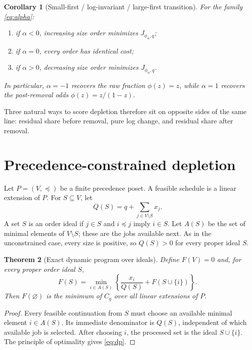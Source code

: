 \documentclass[pdflatex,iicol,sn-basic]{sn-jnl}
\theoremstyle{thmstyleone}
\newtheorem{theorem}{Theorem}[section]
\newtheorem{corollary}[theorem]{Corollary}
\theoremstyle{thmstyletwo}
\theoremstyle{thmstylethree}
\begin{document}
\begin{corollary}[Small-first / log-invariant / large-first transition]
\label{cor:phase}
For the family \eqref{eq:alpha}:
\begin{enumerate}[label=(\roman*),leftmargin=2em]
\item if \(\alpha<0\), increasing size order minimizes \(J_{\phi_\alpha,q}\);
\item if \(\alpha=0\), every order has identical cost;
\item if \(\alpha>0\), decreasing size order minimizes \(J_{\phi_\alpha,q}\).
\end{enumerate}
In particular, \(\alpha=-1\) recovers the raw fraction \(\phi(z)=z\), while
\(\alpha=1\) recovers the post-removal odds \(\phi(z)=z/(1-z)\).
\end{corollary}

Three natural ways to score depletion therefore sit on opposite sides of the
same line: residual share before removal, pure log change, and residual share
after removal.

\section{Precedence-constrained depletion}
\label{sec:precedence}

Let \(P=(V,\preceq)\) be a finite precedence poset. A feasible schedule is a
linear extension of \(P\). For \(S\subseteq V\), let
\[
Q(S)=q+\sum_{j\in V\setminus S}x_j.
\]
A set \(S\) is an order ideal if \(j\in S\) and \(i\preceq j\) imply \(i\in S\).
Let \(A(S)\) be the set of minimal elements of \(V\setminus S\); these are the
jobs available next. As in the unconstrained case, every size is positive, so
\(Q(S)>0\) for every proper ideal \(S\).

\begin{theorem}[Exact dynamic program over ideals]
\label{thm:dp}
Define \(F(V)=0\) and, for every proper order ideal \(S\),
\begin{equation}\label{eq:dp}
F(S)=\min_{i\in A(S)}
\left\{
\frac{x_i}{Q(S)}+F(S\cup\{i\})
\right\}.
\end{equation}
Then \(F(\varnothing)\) is the minimum of \(C_q\) over all linear extensions of
\(P\).
\end{theorem}

\begin{proof}
Every feasible continuation from \(S\) must choose an available minimal element
\(i\in A(S)\). Its immediate denominator is \(Q(S)\), independent of which
available job is selected. After choosing \(i\), the processed set is the ideal
\(S\cup\{i\}\). The principle of optimality gives \eqref{eq:dp}.
\end{proof}
\end{document}
